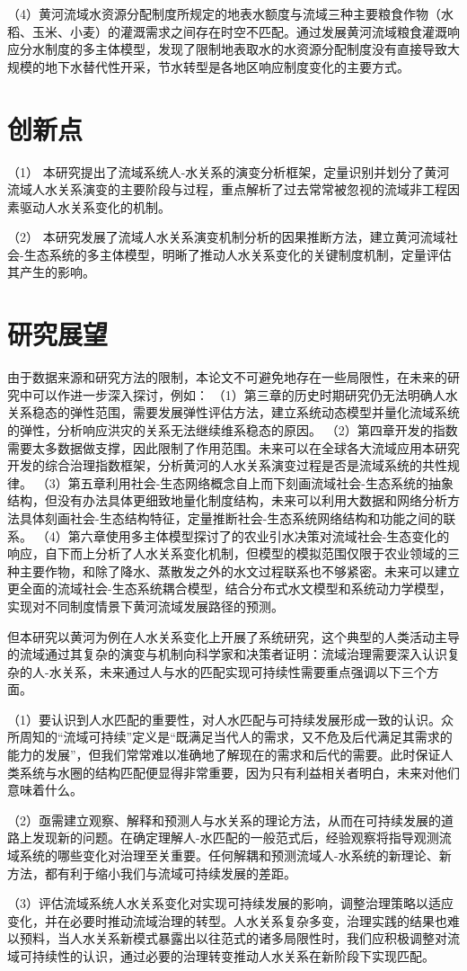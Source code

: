 （4）黄河流域水资源分配制度所规定的地表水额度与流域三种主要粮食作物（水稻、玉米、小麦）的灌溉需求之间存在时空不匹配。通过发展黄河流域粮食灌溉响应分水制度的多主体模型，发现了限制地表取水的水资源分配制度没有直接导致大规模的地下水替代性开采，节水转型是各地区响应制度变化的主要方式。

\section{创新点}

（1） 本研究提出了流域系统人-水关系的演变分析框架，定量识别并划分了黄河流域人水关系演变的主要阶段与过程，重点解析了过去常常被忽视的流域非工程因素驱动人水关系变化的机制。

（2） 本研究发展了流域人水关系演变机制分析的因果推断方法，建立黄河流域社会-生态系统的多主体模型，明晰了推动人水关系变化的关键制度机制，定量评估其产生的影响。

\section{研究展望}

由于数据来源和研究方法的限制，本论文不可避免地存在一些局限性，在未来的研究中可以作进一步深入探讨，例如：
（1）第三章的历史时期研究仍无法明确人水关系稳态的弹性范围，需要发展弹性评估方法，建立系统动态模型并量化流域系统的弹性，分析响应洪灾的关系无法继续维系稳态的原因。
（2）第四章开发的指数需要太多数据做支撑，因此限制了作用范围。未来可以在全球各大流域应用本研究开发的综合治理指数框架，分析黄河的人水关系演变过程是否是流域系统的共性规律。
（3）第五章利用社会-生态网络概念自上而下刻画流域社会-生态系统的抽象结构，但没有办法具体更细致地量化制度结构，未来可以利用大数据和网络分析方法具体刻画社会-生态结构特征，定量推断社会-生态系统网络结构和功能之间的联系。
（4）第六章使用多主体模型探讨了的农业引水决策对流域社会-生态变化的响应，自下而上分析了人水关系变化机制，但模型的模拟范围仅限于农业领域的三种主要作物，和除了降水、蒸散发之外的水文过程联系也不够紧密。未来可以建立更全面的流域社会-生态系统耦合模型，结合分布式水文模型和系统动力学模型，实现对不同制度情景下黄河流域发展路径的预测。

但本研究以黄河为例在人水关系变化上开展了系统研究，这个典型的人类活动主导的流域通过其复杂的演变与机制向科学家和决策者证明：流域治理需要深入认识复杂的人-水关系，未来通过人与水的匹配实现可持续性需要重点强调以下三个方面。

（1）要认识到人水匹配的重要性，对人水匹配与可持续发展形成一致的认识。众所周知的“流域可持续”定义是“既满足当代人的需求，又不危及后代满足其需求的能力的发展”，但我们常常难以准确地了解现在的需求和后代的需要。此时保证人类系统与水圈的结构匹配便显得非常重要，因为只有利益相关者明白，未来对他们意味着什么。

（2）亟需建立观察、解释和预测人与水关系的理论方法，从而在可持续发展的道路上发现新的问题。在确定理解人-水匹配的一般范式后，经验观察将指导观测流域系统的哪些变化对治理至关重要。任何解耦和预测流域人-水系统的新理论、新方法，都有利于缩小我们与流域可持续发展的差距。

（3）评估流域系统人水关系变化对实现可持续发展的影响，调整治理策略以适应变化，并在必要时推动流域治理的转型。人水关系复杂多变，治理实践的结果也难以预料，当人水关系新模式暴露出以往范式的诸多局限性时，我们应积极调整对流域可持续性的认识，通过必要的治理转变推动人水关系在新阶段下实现匹配。
